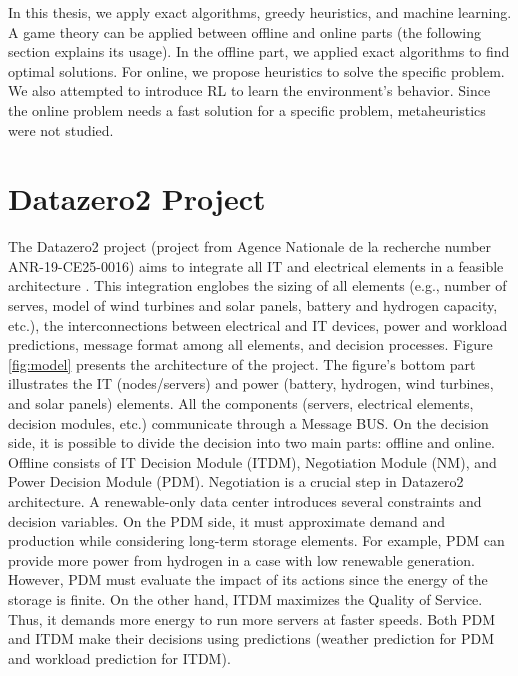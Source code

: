 In this thesis, we apply exact algorithms, greedy heuristics, and machine learning. A game theory can be applied between offline and online parts (the following section explains its usage). In the offline part, we applied exact algorithms to find optimal solutions. For online, we propose heuristics to solve the specific problem. We also attempted to introduce RL to learn the environment's behavior. Since the online problem needs a fast solution for a specific problem, metaheuristics were not studied.

\section{Datazero2 Project}
\label{sec:datazero2_project}

The Datazero2 project (project from Agence Nationale de la recherche number ANR-19-CE25-0016) aims to integrate all IT and electrical elements in a feasible architecture \cite{Datazero}. This integration englobes the sizing of all elements (e.g., number of serves, model of wind turbines and solar panels, battery and hydrogen capacity, etc.), the interconnections between electrical and IT devices, power and workload predictions, message format among all elements, and decision processes. Figure \ref{fig:model} presents the architecture of the project. The figure's bottom part illustrates the IT (nodes/servers) and power (battery, hydrogen, wind turbines, and solar panels) elements. All the components (servers, electrical elements, decision modules, etc.) communicate through a Message BUS. On the decision side, it is possible to divide the decision into two main parts: offline and online. Offline consists of IT Decision Module (ITDM), Negotiation Module (NM), and Power Decision Module (PDM). Negotiation is a crucial step in Datazero2 architecture. A renewable-only data center introduces several constraints and decision variables. On the PDM side, it must approximate demand and production while considering long-term storage elements. For example, PDM can provide more power from hydrogen in a case with low renewable generation. However, PDM must evaluate the impact of its actions since the energy of the storage is finite. On the other hand, ITDM maximizes the Quality of Service. Thus, it demands more energy to run more servers at faster speeds. Both PDM and ITDM make their decisions using predictions (weather prediction for PDM and workload prediction for ITDM).

